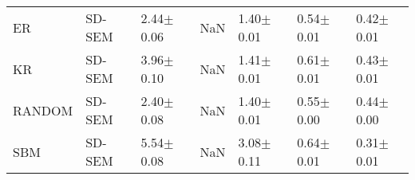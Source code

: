 \begin{tabular}{lllllll}
ER & SD-SEM & 2.44{\scriptsize$\pm$0.06} & NaN & 1.40{\scriptsize$\pm$0.01} & 0.54{\scriptsize$\pm$0.01} & 0.42{\scriptsize$\pm$0.01} \\
KR & SD-SEM & 3.96{\scriptsize$\pm$0.10} & NaN & 1.41{\scriptsize$\pm$0.01} & 0.61{\scriptsize$\pm$0.01} & 0.43{\scriptsize$\pm$0.01} \\
RANDOM & SD-SEM & 2.40{\scriptsize$\pm$0.08} & NaN & 1.40{\scriptsize$\pm$0.01} & 0.55{\scriptsize$\pm$0.00} & 0.44{\scriptsize$\pm$0.00} \\
SBM & SD-SEM & 5.54{\scriptsize$\pm$0.08} & NaN & 3.08{\scriptsize$\pm$0.11} & 0.64{\scriptsize$\pm$0.01} & 0.31{\scriptsize$\pm$0.01} \\
\bottomrule
\end{tabular}
